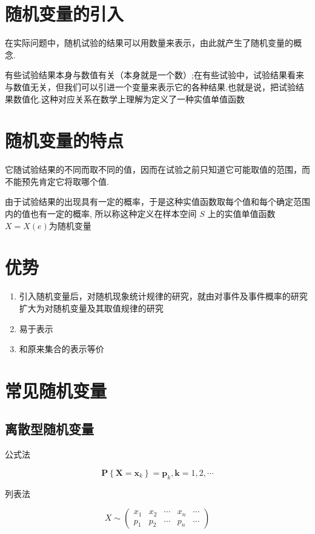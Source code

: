 \section{随机变量的引入}

在实际问题中，随机试验的结果可以用数量来表示，由此就产生了随机变量的概念.

有些试验结果本身与数值有关（本身就是一个数）;在有些试验中，试验结果看来与数值无关，但我们可以引进一个变量来表示它的各种结果.也就是说，把试验结果数值化.这种对应关系在数学上理解为定义了一种实值单值函数

\section{随机变量的特点}

它随试验结果的不同而取不同的值，因而在试验之前只知道它可能取值的范围，而不能预先肯定它将取哪个值.

由于试验结果的出现具有一定的概率，于是这种实值函数取每个值和每个确定范围内的值也有一定的概率, 所以称这种定义在样本空间 $S$ 上的实值单值函数 $X= X(e)$为随机变量

\section{优势}

\begin{enumerate}
    \item 引入随机变量后，对随机现象统计规律的研究，就由对事件及事件概率的研究扩大为对随机变量及其取值规律的研究
    \item 易于表示
    \item 和原来集合的表示等价
\end{enumerate}

\section{常见随机变量}

\subsection{离散型随机变量}

公式法

$$
\boldsymbol{P}\left\{\boldsymbol{X}=\boldsymbol{x}_{k}\right\}=\boldsymbol{p}_{k}, \boldsymbol{k}=1,2, \cdots
$$

列表法
  
$$X \sim\left(\begin{array}{lllll}x_{1} & x_{2} & \cdots & x_{n} & \cdots \\ p_{1} & p_{2} & \cdots & p_{n} & \cdots\end{array}\right)$$

